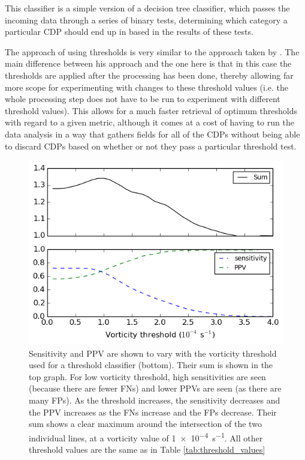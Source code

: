 \documentclass[pdftex,12pt,a4paper]{report}
\begin{document}
This classifier is a simple version of a decision tree classifier, which passes the incoming data
through a series of binary tests, determining which category a particular CDP should end up in based
in the results of these tests.

The approach of using thresholds is very similar to the approach taken by
\textcite{walsh1997objective}. The main difference between his approach and the one here is that in
this case the thresholds are applied after the processing has been done, thereby allowing far more
scope for experimenting with changes to these threshold values (i.e. the whole processing step does
not have to be run to experiment with different threshold values). This allows for a much faster
retrieval of optimum thresholds with regard to a given metric, although it comes at a cost of having
to run the data analysis in a way that gathers fields for all of the CDPs without being able to
discard CDPs based on whether or not they pass a particular threshold test.

\begin{figure}[ht!]
    \centering
    \includegraphics[width=\textwidth]{figures/threshold_sens_ppv_vort}
    \vspace{-10pt}
    \caption{Sensitivity and PPV are shown to vary with the vorticity threshold used for a threshold
        classifier (bottom). Their sum is shown in the top graph. For low vorticity threshold, high
        sensitivities are seen (because there are fewer FNs) and lower PPVs are seen (as there are
        many FPs). As the threshold increases, the sensitivity decreases and the PPV increases as
        the FNs increase and the FPs decrease. Their sum shows a clear maximum around the
        intersection of the two individual lines, at a vorticity value of \SI{1e-4}{s^{-1}}. All
        other threshold values are the same as in Table \ref{tab:threshold_values} }
    \label{fig:threshold_sens_ppv_vort}
\end{figure}
\end{document}
